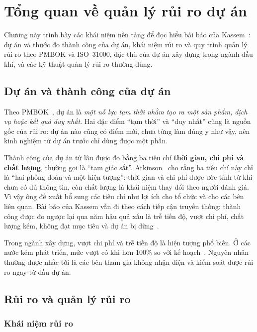 \chapter{Tổng quan về quản lý rủi ro dự án}
\label{chuong:tong-quan}

Chương này trình bày các khái niệm nền tảng để đọc hiểu bài báo của Kassem~\cite{kassem2022}: dự án và thước đo thành công của dự án, khái niệm rủi ro và quy trình quản lý rủi ro theo PMBOK và ISO~31000, đặc thù của dự án xây dựng trong ngành dầu khí, và các kỹ thuật quản lý rủi ro thường dùng.

\section{Dự án và thành công của dự án}
\label{sec:du-an}

Theo PMBOK~\cite{pmbok6}, dự án là \emph{một nỗ lực tạm thời nhằm tạo ra một sản phẩm, dịch vụ hoặc kết quả duy nhất}. Hai đặc điểm ``tạm thời'' và ``duy nhất'' cũng là nguồn gốc của rủi ro: dự án nào cũng có điểm mới, chưa từng làm đúng y như vậy, nên kinh nghiệm từ dự án trước chỉ dùng được một phần.

Thành công của dự án từ lâu được đo bằng ba tiêu chí \textbf{thời gian, chi phí và chất lượng}, thường gọi là ``tam giác sắt''. Atkinson~\cite{atkinson1999} cho rằng ba tiêu chí này chỉ là ``hai phỏng đoán và một hiện tượng'': thời gian và chi phí được ước tính từ khi chưa có đủ thông tin, còn chất lượng là khái niệm thay đổi theo người đánh giá. Vì vậy ông đề xuất bổ sung các tiêu chí như lợi ích cho tổ chức và cho các bên liên quan. Bài báo của Kassem vẫn đi theo cách tiếp cận truyền thống: thành công được đo ngược lại qua năm hậu quả xấu là trễ tiến độ, vượt chi phí, chất lượng kém, không đạt mục tiêu và dự án bị dừng~\cite{kassem2022}.

Trong ngành xây dựng, vượt chi phí và trễ tiến độ là hiện tượng phổ biến. Ở các nước kém phát triển, mức vượt có khi hơn 100\% so với kế hoạch~\cite{kassem2022}. Nguyên nhân thường được nhắc tới là các bên tham gia không nhận diện và kiểm soát được rủi ro ngay từ đầu dự án.

\section{Rủi ro và quản lý rủi ro}
\label{sec:rui-ro}

\subsection{Khái niệm rủi ro}

